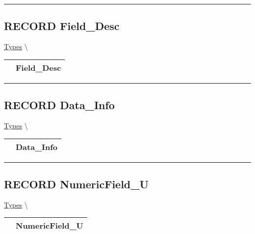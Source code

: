 \par


\rule{\linewidth}{0.5pt}
\subsection*{\textsf{\colorbox{headtoc}{\color{white} RECORD}
Field\_Desc}}

\hypertarget{ecldoc:types.field_desc}{}
\hspace{0pt} \hyperlink{ecldoc:Types}{Types} \textbackslash 

{\renewcommand{\arraystretch}{1.5}
\begin{tabularx}{\textwidth}{|>{\raggedright\arraybackslash}l|X|}
\hline
\hspace{0pt}\mytexttt{\color{red} } & \textbf{Field\_Desc} \\
\hline
\end{tabularx}
}

\par


\rule{\linewidth}{0.5pt}
\subsection*{\textsf{\colorbox{headtoc}{\color{white} RECORD}
Data\_Info}}

\hypertarget{ecldoc:types.data_info}{}
\hspace{0pt} \hyperlink{ecldoc:Types}{Types} \textbackslash 

{\renewcommand{\arraystretch}{1.5}
\begin{tabularx}{\textwidth}{|>{\raggedright\arraybackslash}l|X|}
\hline
\hspace{0pt}\mytexttt{\color{red} } & \textbf{Data\_Info} \\
\hline
\end{tabularx}
}

\par


\rule{\linewidth}{0.5pt}
\subsection*{\textsf{\colorbox{headtoc}{\color{white} RECORD}
NumericField\_U}}

\hypertarget{ecldoc:types.numericfield_u}{}
\hspace{0pt} \hyperlink{ecldoc:Types}{Types} \textbackslash 

{\renewcommand{\arraystretch}{1.5}
\begin{tabularx}{\textwidth}{|>{\raggedright\arraybackslash}l|X|}
\hline
\hspace{0pt}\mytexttt{\color{red} } & \textbf{NumericField\_U} \\
\hline
\end{tabularx}
}

